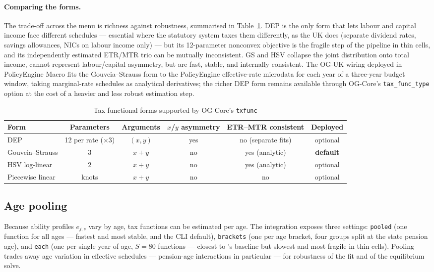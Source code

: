 \paragraph{Comparing the forms.} The trade-off across the menu is richness against robustness, summarised in Table~\ref{tab:txforms}. DEP is the only form that lets labour and capital income face different schedules --- essential where the statutory system taxes them differently, as the UK does (separate dividend rates, savings allowances, NICs on labour income only) --- but its 12-parameter nonconvex objective is the fragile step of the pipeline in thin cells, and its independently estimated ETR/MTR trio can be mutually inconsistent. GS and HSV collapse the joint distribution onto total income, cannot represent labour/capital asymmetry, but are fast, stable, and internally consistent. The OG-UK wiring deployed in PolicyEngine Macro fits the Gouveia--Strauss form to the PolicyEngine effective-rate microdata for each year of a three-year budget window, taking marginal-rate schedules as analytical derivatives; the richer DEP form remains available through OG-Core's \texttt{tax\_func\_type} option at the cost of a heavier and less robust estimation step.

\begin{table}[t]
\centering
\caption{Tax functional forms supported by OG-Core's \texttt{txfunc}}
\label{tab:txforms}
\footnotesize
\begin{tabular}{lccccc}
\toprule
Form & Parameters & Arguments & $x$/$y$ asymmetry & ETR--MTR consistent & Deployed \\
\midrule
DEP & 12 per rate ($\times$3) & $(x,y)$ & yes & no (separate fits) & optional \\
Gouveia--Strauss & 3 & $x+y$ & no & yes (analytic) & \textbf{default} \\
HSV log-linear & 2 & $x+y$ & no & yes (analytic) & optional \\
Piecewise linear & knots & $x+y$ & no & no & optional \\
\bottomrule
\end{tabular}
\end{table}

\subsection{Age pooling}
\label{subsec:agepooling}

Because ability profiles $e_{j,s}$ vary by age, tax functions can be estimated per age. The integration exposes three settings: \texttt{pooled} (one function for all ages --- fastest and most stable, and the CLI default), \texttt{brackets} (one per age bracket, four groups split at the state pension age), and \texttt{each} (one per single year of age, $S=80$ functions --- closest to \citet{DeBackerEvansPhillips2019}'s baseline but slowest and most fragile in thin cells). Pooling trades away age variation in effective schedules --- pension-age interactions in particular --- for robustness of the fit and of the equilibrium solve.
